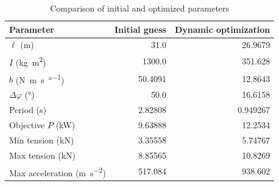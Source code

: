 \begin{table}[htbp]
  \centering
  \caption{Comparison of initial and optimized parameters}
  \label{tab:parameter_comparison}
  \begin{tabular}{lrr}
    \toprule
    Parameter & \multicolumn{1}{c}{Initial guess} & \multicolumn{1}{c}{Dynamic optimization} \\ 
    \midrule
    $\ell$ (\si{\meter}) & 31.0 & 26.9679 \\ 
    $I$ (\si{\kilogram\meter\squared}) & 1300.0 & 351.628 \\ 
    $b$ (\si{\newton\meter\second\per\degree}) & 50.4091 & 12.8643 \\ 
    $\Delta\varphi$ (\si{\degree}) & 50.0 & 16.6158 \\ 
    \midrule
    Period (\si{\second}) & 2.82808 & 0.949267 \\ 
    Objective $P$ (\si{\kilo\watt}) & 9.63888 & 12.2534 \\ 
    Min tension (\si{\kilo\newton}) & 3.35558 & 5.74767 \\ 
    Max tension (\si{\kilo\newton}) & 8.85565 & 10.8269 \\ 
    Max acceleration (\si{\meter\per\square\second}) & 517.084 & 938.602 \\ 
    \bottomrule
  \end{tabular}
\end{table}
